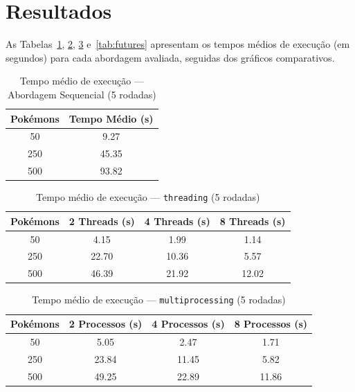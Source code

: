 \documentclass[12pt]{article}
\begin{document}
\section{Resultados}

As Tabelas~\ref{tab:seq}, \ref{tab:thread}, \ref{tab:multiproc}
e~\ref{tab:futures} apresentam os tempos médios de execução (em segundos) para
cada abordagem avaliada, seguidas dos gráficos comparativos.

\begin{table}[ht]
\centering
\caption{Tempo médio de execução — Abordagem Sequencial (5 rodadas)}
\label{tab:seq}
\begin{tabular}{cc}
\toprule
\textbf{Pokémons} & \textbf{Tempo Médio (s)} \\
\midrule
50  & 9.27 \\
250 & 45.35 \\
500 & 93.82 \\
\bottomrule
\end{tabular}
\end{table}

\begin{table}[ht]
\centering
\caption{Tempo médio de execução — \texttt{threading} (5 rodadas)}
\label{tab:thread}
\begin{tabular}{cccc}
\toprule
\textbf{Pokémons} & \textbf{2 Threads (s)} & \textbf{4 Threads (s)} & \textbf{8 Threads (s)} \\
\midrule
50  & 4.15 & 1.99 & 1.14 \\
250 & 22.70 & 10.36 & 5.57 \\
500 & 46.39 & 21.92 & 12.02 \\
\bottomrule
\end{tabular}
\end{table}

\begin{table}[ht]
\centering
\caption{Tempo médio de execução — \texttt{multiprocessing} (5 rodadas)}
\label{tab:multiproc}
\begin{tabular}{cccc}
\toprule
\textbf{Pokémons} & \textbf{2 Processos (s)} & \textbf{4 Processos (s)} & \textbf{8 Processos (s)} \\
\midrule
50  & 5.05 & 2.47 & 1.71 \\
250 & 23.84 & 11.45 & 5.82 \\
500 & 49.25 & 22.89 & 11.86 \\
\bottomrule
\end{tabular}
\end{table}
\end{document}
